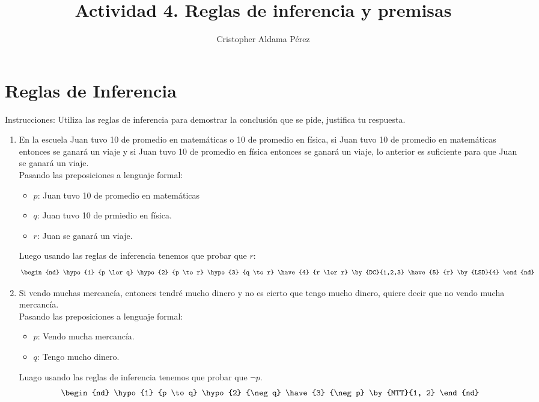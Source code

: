 \documentclass[a4paper,10pt]{article}
\title{Actividad 4. Reglas de inferencia y premisas}
\author{Cristopher Aldama Pérez}
\begin{document}
\maketitle

\section{Reglas de Inferencia}
Instrucciones: Utiliza las reglas de inferencia para demostrar la conclusión que se pide, justifica tu respuesta.

\begin{enumerate}
 \item En la escuela Juan tuvo 10 de promedio en matemáticas o 10 de promedio en física, si Juan tuvo 10 de promedio en matemáticas entonces se ganará un viaje y si Juan tuvo 10 de promedio en física entonces se ganará un viaje, lo anterior es suficiente para que Juan se ganará un viaje.\\
 Pasando las preposiciones a lenguaje formal:
 \begin{itemize}
  \item \(p\): Juan tuvo 10 de promedio en matemáticas
  \item \(q\): Juan tuvo 10 de prmiedio en física.
  \item \(r\): Juan se ganará un viaje.
 \end{itemize}
Luego usando las reglas de inferencia tenemos que probar que \(r\):
\[
\begin{nd}
  \hypo {1} {p \lor q}
  \hypo {2} {p \to r}
  \hypo {3} {q \to r}
  \have {4} {r \lor r} \by{DC}{1,2,3}
  \have {5} {r} \by{LSD}{4}
\end{nd}
\]

\item Si vendo muchas mercancía, entonces tendré mucho dinero y no es cierto que tengo mucho dinero, quiere decir que no vendo mucha mercancía.\\
Pasando las preposiciones a lenguaje formal:
\begin{itemize}
 \item \(p\): Vendo mucha mercancía.
 \item \(q\): Tengo mucho dinero.
\end{itemize}
Luago usando las reglas de inferencia tenemos que probar que \(\neg p\).
\[
 \begin{nd}
   \hypo {1} {p \to q}
   \hypo {2} {\neg q}
   \have {3} {\neg p} \by{MTT}{1, 2}
 \end{nd}
\]


\end{enumerate}
\end{document}
